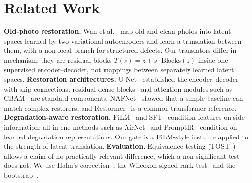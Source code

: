 \documentclass[conference]{IEEEtran}
\begin{document}
\section{Related Work}
\textbf{Old-photo restoration.} Wan et al.~\cite{wan2020bringing,wan2023tpami} map old and clean photos into
latent spaces learned by two variational autoencoders and learn a translation between them, with a non-local
branch for structured defects. Our translators differ in mechanism: they are residual blocks
$T(z)=z+s\cdot\mathrm{Blocks}(z)$ inside one supervised encoder--decoder, not mappings between separately learned
latent spaces.
\textbf{Restoration architectures.} U-Net~\cite{ronneberger2015unet} established the encoder--decoder with skip
connections; residual dense blocks~\cite{wang2018esrgan} and attention modules such as CBAM~\cite{woo2018cbam} are
standard components. NAFNet~\cite{chen2022nafnet} showed that a simple baseline can match complex restorers, and
Restormer~\cite{zamir2022restormer} is a common transformer reference.
\textbf{Degradation-aware restoration.} FiLM~\cite{perez2018film} and SFT~\cite{wang2018sft} condition features
on side information; all-in-one methods such as AirNet~\cite{li2022airnet} and PromptIR~\cite{potlapalli2023promptir}
condition on learned degradation representations. Our gate is a FiLM-style instance applied to the strength of
latent translation.
\textbf{Evaluation.} Equivalence testing (TOST~\cite{schuirmann1987tost,lakens2017equivalence}) allows a claim of
no practically relevant difference, which a non-significant test does not. We use Holm's
correction~\cite{holm1979}, the Wilcoxon signed-rank test~\cite{wilcoxon1945} and the
bootstrap~\cite{efron1979bootstrap}.
\end{document}
